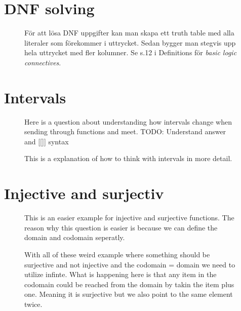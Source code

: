 \documentclass[a5paper]{article}
\begin{document}
\section*{DNF solving}
\begin{figure}[ht]
	\centering
	\caption*{För att lösa DNF uppgifter kan man skapa ett truth table med alla literaler som förekommer i uttrycket.
		Sedan bygger man stegvis upp hela uttrycket med fler kolumner.
        Se s.12 i Definitions för \emph{basic logic connectives}.
	}\label{fig:2018-5-1}
\end{figure}

\section*{Intervals}
\begin{figure}[ht]
	\centering
	\caption*{Here is a question about understanding how intervals change when sending through functions and meet. TODO: Understand answer and [[]] syntax
	}\label{fig:2017_1-1-1}
\end{figure}
\begin{figure}[ht]
	\centering
	\caption*{This is a explanation of how to think with intervals in more detail.
	}\label{fig:2017_1-1-1}
\end{figure}
\section*{Injective and surjectiv}
\begin{figure}[ht]
	\centering
	\caption*{This is an easier example for injective and surjective functions. The reason why this question is easier is because we can define the domain and codomain seperatly.
	}\label{fig:2017_1-1-1}
\end{figure}
\begin{figure}[ht]
	\centering
	\caption*{With all of these weird example where something should be surjective and not injective and the codomain = domain we need to utilize infinte. What is happening here is that any item in the codomain could be reached from the domain by takin the item plus one. Meaning it is surjective but we also point to the same element twice. 
	}\label{fig:2017_1-3-4-1}
\end{figure}
\end{document}
